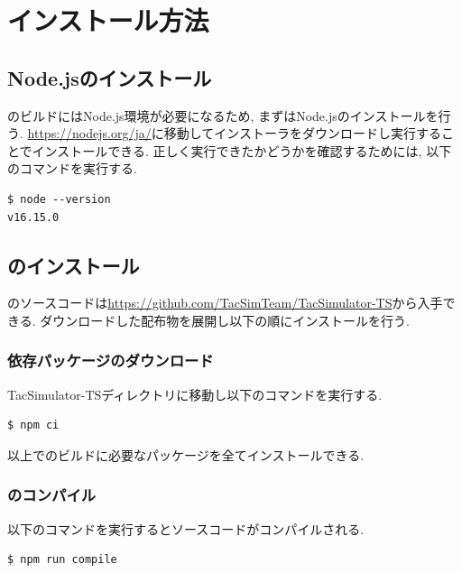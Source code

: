 \chapter{インストール方法}

\section{Node.jsのインストール}

\tacsim のビルドにはNode.js環境が必要になるため, まずはNode.jsのインストールを行う.
\url{https://nodejs.org/ja/}に移動してインストーラをダウンロードし実行することでインストールできる. 正しく実行できたかどうかを確認するためには, 以下のコマンドを実行する.

\begin{mylist}
\begin{verbatim}
$ node --version
v16.15.0
\end{verbatim}
\end{mylist}

\section{\tacsim のインストール}

\tacsim のソースコードは\url{https://github.com/TacSimTeam/TacSimulator-TS}から入手できる. ダウンロードした配布物を展開し以下の順にインストールを行う.

\subsection{依存パッケージのダウンロード}

TacSimulator-TSディレクトリに移動し以下のコマンドを実行する.

\begin{mylist}
\begin{verbatim}
$ npm ci
\end{verbatim}
\end{mylist}

以上で\tacsim のビルドに必要なパッケージを全てインストールできる.

\subsection{\tacsim のコンパイル}

以下のコマンドを実行するとソースコードがコンパイルされる.

\begin{mylist}
\begin{verbatim}
$ npm run compile
\end{verbatim}
\end{mylist}

